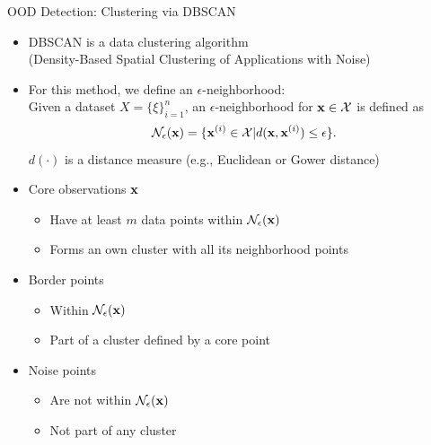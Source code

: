 \documentclass[10pt,compress,t,notes=noshow, xcolor=table]{beamer}
\begin{document}
\begin{frame}[c]{OOD Detection: Clustering via DBSCAN}
\begin{itemize}
	\item DBSCAN is a data clustering algorithm \\ (Density-Based Spatial Clustering of Applications with Noise) 
	\pause
	\item For this method, we define an $\epsilon$-neighborhood: \\
	Given a dataset $X = \{\xi\}_{i = 1}^n$, an $\epsilon$-neighborhood for $\mathbf{x} \in \mathcal{X}$ is defined as 
	$$ \mathcal{N}_{\epsilon}(\mathbf{x}) = \{\mathbf{x}^{(i)} \in \mathcal{X} | d(\mathbf{x}, \mathbf{x}^{(i)}) \le \epsilon\}.$$
	 $d(\cdot)$ is a distance measure (e.g., Euclidean or Gower distance) 
	 \pause
	\item Core observations $\mathbf{x}$
	\begin{itemize}
	    \item Have at least $m$ data points within $\mathcal{N}_{\epsilon}(\mathbf{x})$
	    \item Forms an own cluster with all its neighborhood points
	\end{itemize}
	\pause
    \item Border points
    \begin{itemize}
        \item Within $\mathcal{N}_{\epsilon}(\mathbf{x})$
        \item Part of a cluster defined by a core point
    \end{itemize}
    \pause
    \item Noise points
    \begin{itemize}
        \item Are not within $\mathcal{N}_{\epsilon}(\mathbf{x})$
        \item Not part of any cluster
    \end{itemize}
\end{itemize}
\end{frame}
\end{document}
